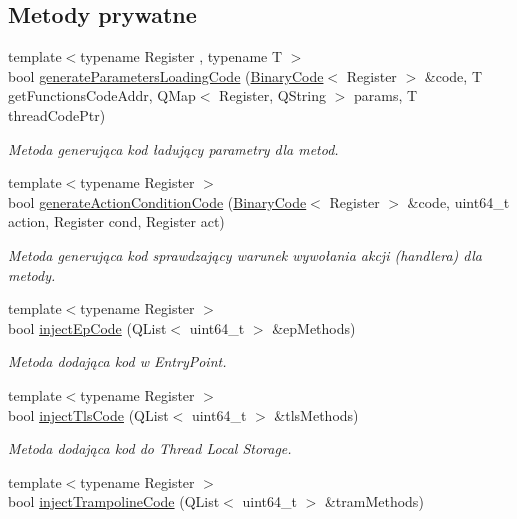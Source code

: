 \subsection*{Metody prywatne}
\begin{DoxyCompactItemize}
\item 
{\footnotesize template$<$typename Register , typename T $>$ }\\bool \hyperlink{class_p_e_adding_methods_ad9ff3b76f2baaa04bd71dc37508d0c12}{generate\-Parameters\-Loading\-Code} (\hyperlink{class_binary_code}{Binary\-Code}$<$ Register $>$ \&code, T get\-Functions\-Code\-Addr, Q\-Map$<$ Register, Q\-String $>$ params, T thread\-Code\-Ptr)
\begin{DoxyCompactList}\small\item\em Metoda generująca kod ładujący parametry dla metod. \end{DoxyCompactList}\item 
{\footnotesize template$<$typename Register $>$ }\\bool \hyperlink{class_p_e_adding_methods_a364d4eec1e6f1e93c93f8da7355e9958}{generate\-Action\-Condition\-Code} (\hyperlink{class_binary_code}{Binary\-Code}$<$ Register $>$ \&code, uint64\-\_\-t action, Register cond, Register act)
\begin{DoxyCompactList}\small\item\em Metoda generująca kod sprawdzający warunek wywołania akcji (handlera) dla metody. \end{DoxyCompactList}\item 
{\footnotesize template$<$typename Register $>$ }\\bool \hyperlink{class_p_e_adding_methods_a03c66cfef8c9a6aefb0166b63e501898}{inject\-Ep\-Code} (Q\-List$<$ uint64\-\_\-t $>$ \&ep\-Methods)
\begin{DoxyCompactList}\small\item\em Metoda dodająca kod w Entry\-Point. \end{DoxyCompactList}\item 
{\footnotesize template$<$typename Register $>$ }\\bool \hyperlink{class_p_e_adding_methods_a16ab45ebef33f806f962985dbb921d54}{inject\-Tls\-Code} (Q\-List$<$ uint64\-\_\-t $>$ \&tls\-Methods)
\begin{DoxyCompactList}\small\item\em Metoda dodająca kod do Thread Local Storage. \end{DoxyCompactList}\item 
{\footnotesize template$<$typename Register $>$ }\\bool \hyperlink{class_p_e_adding_methods_a7bfc807cbd6863be7a0caaab742668bb}{inject\-Trampoline\-Code} (Q\-List$<$ uint64\-\_\-t $>$ \&tram\-Methods)

\end{DoxyCompactItemize}

